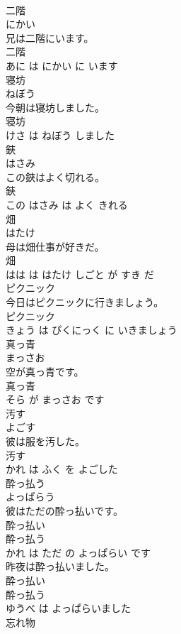 \documentclass[8pt]{extreport}
\begin{document}
\begin{CJK}{UTF8}{min}
\\	二階	
\\	にかい			
\\	兄は二階にいます。	
\\	二階 
\\	あに は にかい に います			
\\	寝坊	
\\	ねぼう			
\\	今朝は寝坊しました。	
\\	寝坊 
\\	けさ は ねぼう しました			
\\	鋏	
\\	はさみ			
\\	この鋏はよく切れる。	
\\	鋏 
\\	この はさみ は よく きれる			
\\	畑	
\\	はたけ			
\\	母は畑仕事が好きだ。	
\\	畑 
\\	はは は はたけ しごと が すき だ			
\\	ピクニック	
\\	今日はピクニックに行きましょう。	
\\	ピクニック 
\\	きょう は ぴくにっく に いきましょう			
\\	真っ青	
\\	まっさお			
\\	空が真っ青です。	
\\	真っ青 
\\	そら が まっさお です			
\\	汚す	
\\	よごす			
\\	彼は服を汚した。	
\\	汚す 
\\	かれ は ふく を よごした			
\\	酔っ払う	
\\	よっぱらう			
\\	彼はただの酔っ払いです。	
\\	酔っ払い 
\\	酔っ払う 
\\	かれ は ただ の よっぱらい です			
\\	昨夜は酔っ払いました。	
\\	酔っ払い 
\\	酔っ払う 
\\	ゆうべ は よっぱらいました			
\\	忘れ物	

\end{CJK}
\end{document}
